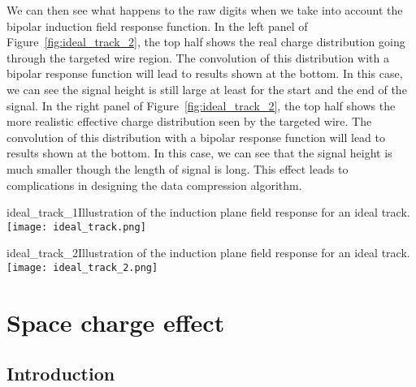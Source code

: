 We can then see what happens to the raw digits when we take into account the bipolar induction 
field response function. In the left panel of Figure~\ref{fig:ideal_track_2}, the top half shows 
the real charge distribution going through the targeted wire region. The convolution of this 
distribution with a bipolar response function will lead to results shown at the bottom. In this 
case, we can see the signal height is still large at least for the start and the end of the 
signal. In the right panel of Figure~\ref{fig:ideal_track_2}, the top half shows the more 
realistic effective charge distribution seen by the targeted wire. The convolution of this 
distribution with a bipolar response function will lead to results shown at the bottom. In 
this case, we can see that the signal height is much smaller though the length of signal is 
long. This effect leads to complications in designing the data compression algorithm.


\begin{cdrfigure}{ideal_track_1}{Illustration of the induction plane field response for an ideal track.}
  \texttt{[image: ideal\_track.png]}
\end{cdrfigure}

\begin{cdrfigure}{ideal_track_2}{Illustration of the induction plane field response for an ideal track.}
\texttt{[image: ideal\_track\_2.png]}
\end{cdrfigure}





\section{Space charge effect}

\subsection{Introduction} \label{sec:SCEintro}

